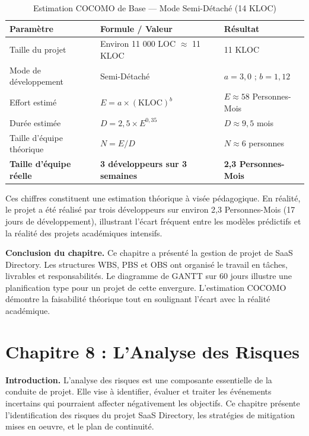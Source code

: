 \begin{table}[H]
\centering
\caption{Estimation COCOMO de Base --- Mode Semi-Détaché (14 KLOC)}
\label{tab:cocomo}
\begin{tabular}{@{}lll@{}}
\toprule
\textbf{Paramètre} & \textbf{Formule / Valeur} & \textbf{Résultat} \\
\midrule
Taille du projet & Environ 11 000 LOC $\approx$ 11 KLOC & 11 KLOC \\
Mode de développement & Semi-Détaché & $a = 3{,}0$ ; $b = 1{,}12$ \\
Effort estimé & $E = a \times (\text{KLOC})^b$ & $E \approx 58$ Personnes-Mois \\
Durée estimée & $D = 2{,}5 \times E^{0{,}35}$ & $D \approx 9{,}5$ mois \\
Taille d'équipe théorique & $N = E / D$ & $N \approx 6$ personnes \\
\midrule
\textbf{Taille d'équipe réelle} & \textbf{3 développeurs sur 3 semaines} & \textbf{2,3 Personnes-Mois} \\
\bottomrule
\end{tabular}
\end{table}

Ces chiffres constituent une estimation théorique à visée pédagogique. En réalité, le projet a été réalisé par trois développeurs sur environ 2,3 Personnes-Mois (17 jours de développement), illustrant l'écart fréquent entre les modèles prédictifs et la réalité des projets académiques intensifs.

\textbf{Conclusion du chapitre.} Ce chapitre a présenté la gestion de projet de SaaS Directory. Les structures WBS, PBS et OBS ont organisé le travail en tâches, livrables et responsabilités. Le diagramme de GANTT sur 60 jours illustre une planification type pour un projet de cette envergure. L'estimation COCOMO démontre la faisabilité théorique tout en soulignant l'écart avec la réalité académique.


\section{Chapitre 8 : L'Analyse des Risques}

\textbf{Introduction.} L'analyse des risques est une composante essentielle de la conduite de projet. Elle vise à identifier, évaluer et traiter les événements incertains qui pourraient affecter négativement les objectifs. Ce chapitre présente l'identification des risques du projet SaaS Directory, les stratégies de mitigation mises en oeuvre, et le plan de continuité.

